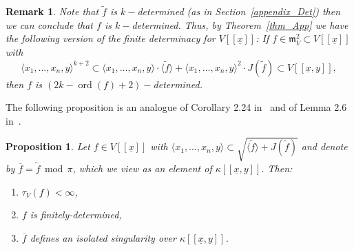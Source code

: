 \documentclass{article}
\newtheorem{proposition}[theorem]{Proposition}
\newtheorem{remark}[theorem]{Remark}
\DeclareMathOperator{\ord}{ord}
\newcommand{\maxV}{\mathfrak{m}_V}
\newcommand{\Vx}{V[[\underline{x}]]}
\newcommand{\Vxy}{V[[\underline{x},y]]}
\numberwithin{theorem}{section}
\renewcommand{\mod}{\,\operatorname{mod}\,}
\begin{document}
\begin{remark}\label{rem:determinacy}
     \textup{Note that $\tilde{f}$ is $k-$determined (as in Section~\ref{appendix_Det}) then we can conclude that  ${f}$ is $k-$determined. Thus, by Theorem~\ref{thm_App} we have the following version of the finite determinacy for $\Vx$: If $f \in \maxV^2 \subset \Vx$ with
    \begin{equation*}
        \langle x_1, \dots, x_n,y \rangle^{k+2} \subset \langle x_1, \dots, x_n,y \rangle \cdot \langle \tilde{f} \rangle + \langle x_1, \dots, x_n,y \rangle^2 \cdot J(\tilde{f}) \subset \Vxy,
    \end{equation*}
      then $f$ is $\left(2k-\ord\left(f\right)+2\right)-$determined. }
\end{remark} 



The following proposition is an analogue of Corollary 2.24 in~\cite{greuel2007introduction} and of Lemma 2.6 in~\cite{greuel1990simple}.

\begin{proposition}\label{lem:reduc_a}
    Let $f \in \Vx$ with $\langle x_1, \dots, x_n,y \rangle \subset  \sqrt{\langle \tilde{f} \rangle + J(\tilde{f})}$ and denote by $\overline{f} = \tilde{f} \mod \pi$, which we view as an element of $\kappa[[\underline{x},y]]$. Then:
    \begin{enumerate}
        \item $\tau_V\left(f\right) < \infty$,
        \item $f$ is finitely-determined,
        \item $\overline{f}$ defines an isolated singularity over $\kappa[[\underline{x},y]]$.
    \end{enumerate} 
\end{proposition}
\end{document}
